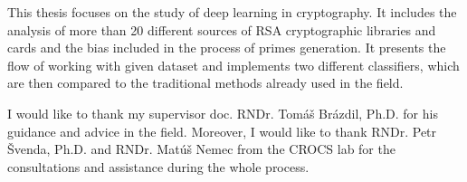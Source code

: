 
 {This thesis focuses on the study of deep learning in cryptography. It includes the analysis of more than 20 different sources of RSA cryptographic libraries and cards and the bias included in the process of primes generation. It presents the flow of working with given dataset and implements two different classifiers, which are then compared to the traditional methods already used in the field.}

 {I would like to thank my supervisor doc. RNDr. Tomáš Brázdil, Ph.D. for his guidance and advice in the field. Moreover, I would like to thank RNDr. Petr Švenda, Ph.D. and RNDr. Matúš Nemec from the CROCS lab for the consultations and assistance during the whole process.}
